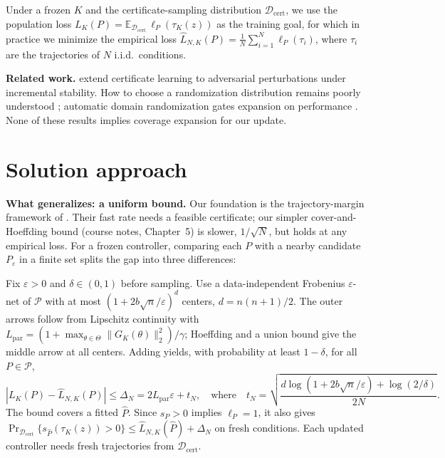 \documentclass{l4dc2026}
\newcommand{\Lhat}{\widehat L_{N,K}}
\newcommand{\Dcert}{\mathcal D_{\mathrm{cert}}}
\newcommand{\Pclass}{\mathcal P}
\newcommand{\G}{G_K}
\begin{document}
Under a frozen $K$ and the certificate-sampling distribution $\Dcert$, we use the
population loss $L_K(P)=\mathbb E_{\Dcert}\,\ell_P(\tau_K(z))$ as the training goal, for
which in practice we minimize the empirical loss
$\Lhat(P)=\frac1N\sum_{i=1}^N\ell_P(\tau_i)$, where $\tau_i$ are the trajectories of $N$
i.i.d.\ conditions.

\textbf{Related work.}
\citet{zhang2022adversarially} extend certificate learning to adversarial perturbations under
incremental stability. How to choose a randomization distribution remains poorly understood
\citep{fujinami2025sample}; automatic domain randomization gates expansion on performance
\citep{akkaya2019solving}. None of these results implies coverage expansion for our update.

\section{Solution approach}\label{sec:approach}
\textbf{What generalizes: a uniform bound.}
Our foundation is the trajectory-margin framework of \citet{boffi2021learning}. Their fast rate
needs a feasible certificate; our simpler cover-and-Hoeffding bound (course notes, Chapter~5)
is slower, $1/\sqrt N$, but holds at any empirical loss. For a frozen controller, comparing each
$P$ with a nearby candidate $P_\varepsilon$ in a finite set splits the gap into three differences:
\begin{center}
\vspace{-5pt}
\vspace{-5pt}
\end{center}
Fix $\varepsilon>0$ and $\delta\in(0,1)$ before sampling. Use a data-independent Frobenius
$\varepsilon$-net of $\Pclass$ with at most $(1+2b\sqrt n/\varepsilon)^d$ centers, $d=n(n+1)/2$.
The outer arrows follow from Lipschitz continuity with
$L_{\mathrm{par}}=(1+\max_{\theta\in\Theta}\|\G(\theta)\|_2^2)/\gamma$;
Hoeffding and a union bound give the middle arrow at all centers.
Adding yields, with probability at least $1-\delta$, for all $P\in\Pclass$,
\[
 |L_K(P)-\Lhat(P)|\le\Delta_N=2L_{\mathrm{par}}\varepsilon+t_N,
 \quad\text{where}\quad
 t_N=\sqrt{\frac{d\log(1+2b\sqrt n/\varepsilon)+\log(2/\delta)}{2N}}.
\]
The bound covers a fitted $\widehat P$. Since $s_P>0$ implies $\ell_P=1$, it also gives
$\Pr_{\Dcert}\{s_{\widehat P}(\tau_K(z))>0\}\le\Lhat(\widehat P)+\Delta_N$ on fresh conditions.
Each updated controller needs fresh trajectories from $\Dcert$.
\end{document}
